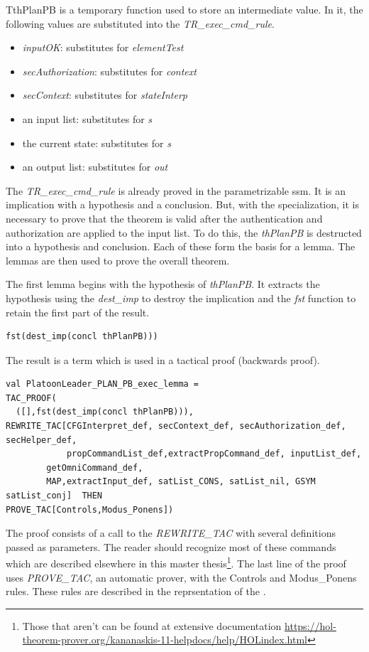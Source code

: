 \documentclass[../../main/main.tex]{subfiles}
\begin{document}
TthPlanPB is a temporary function used to store an intermediate value. In it, the following values are substituted into the \textit{TR_exec_cmd_rule}.  

\begin{itemize}
\item \textit{inputOK}: substitutes for \textit{elementTest}
\item \textit{secAuthorization}: substitutes for \textit{context}
\item \textit{secContext}: substitutes for \textit{stateInterp}
\item an input list: substitutes for \textit{s}
\item the current state: substitutes for \textit{s}
\item an output list: substitutes for \textit{out}
\end{itemize}

The \textit{TR_exec_cmd_rule} is already proved in the parametrizable ssm. It is an implication with a hypothesis and a conclusion.  But, with the specialization, it is necessary to prove that the theorem is valid after the authentication and authorization are applied to the input list. To do this, the \textit{thPlanPB} is destructed into a hypothesis and conclusion.  Each of these form the basis for a lemma.  The lemmas are then used to prove the overall theorem.

The first lemma begins with the hypothesis of \textit{thPlanPB}. It extracts the hypothesis using the \textit{dest_imp} to destroy the implication and the \textit{fst} function to retain the first part of the result.  

\begin{lstlisting}
fst(dest_imp(concl thPlanPB)))
\end{lstlisting}

The result is a  term which is used in a tactical proof (backwards proof).
\begin{lstlisting}
val PlatoonLeader_PLAN_PB_exec_lemma =
TAC_PROOF(
  ([],fst(dest_imp(concl thPlanPB))),
REWRITE_TAC[CFGInterpret_def, secContext_def, secAuthorization_def, secHelper_def,
            propCommandList_def,extractPropCommand_def, inputList_def,
	    getOmniCommand_def,
	    MAP,extractInput_def, satList_CONS, satList_nil, GSYM satList_conj]  THEN
PROVE_TAC[Controls,Modus_Ponens])
\end{lstlisting}

The proof consists of a call to the \textit{REWRITE_TAC} with several definitions passed as parameters.  The reader should recognize most of these commands which are described elsewhere in this master thesis\footnote{Those that aren't can be found at  extensive documentation \url{https://hol-theorem-prover.org/kananaskis-11-helpdocs/help/HOLindex.html}}.  The last line of the proof uses \textit{PROVE_TAC}, an automatic prover, with the Controls and Modus_Ponens rules.  These rules are described in the  reprsentation of the .
\end{document}
